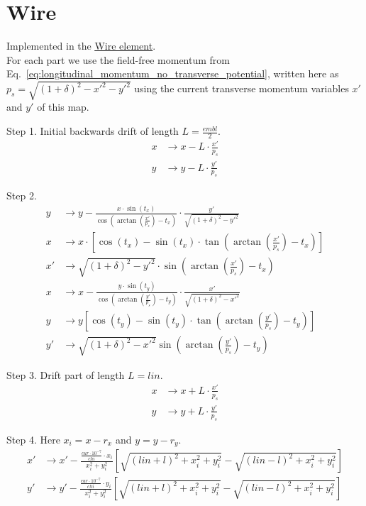 \section{Wire}

Implemented in the \href{https://xsuite.readthedocs.io/en/latest/apireference.html#wire}{\underline{Wire element}}.
~\\

For each part we use the field-free momentum from
Eq.~\eqref{eq:longitudinal_momentum_no_transverse_potential}, written here
as $p_s=\sqrt{(1+\delta)^2-x'^2-y'^2}$ using the current transverse
momentum variables $x'$ and $y'$ of this map.

Step 1. Initial backwards drift of length $L=\frac{embl}{2}$.
\begin{align*}
	x &\to x - L\cdot\frac{x'}{p_s} \\
    y &\to y - L\cdot\frac{y'}{p_s}
\end{align*}

Step 2.
\begin{align*}
	y &\to y - \frac{x\cdot\sin(t_x)}{
    \cos\left(\arctan\left(\frac{x'}{p_s}\right)-t_x\right)}\cdot
    \frac{y'}{\sqrt{(1+\delta)^2-y'^2}} \\
    x &\to x\cdot\left[\cos(t_x)-\sin(t_x)\cdot\tan\left(
    \arctan\left(\frac{x'}{p_s}\right)-t_x\right)\right] \\
    x' &\to \sqrt{(1+\delta)^2-y'^2}\cdot\sin\left(
    \arctan\left(\frac{x'}{p_s}\right)-t_x\right) \\
    x &\to x- \frac{y\cdot\sin(t_y)}{\cos\left(\arctan\left(\frac{y'}{p_s}\right)
    -t_y\right)} \cdot\frac{x'}{\sqrt{(1+\delta)^2-x'^2}} \\
    y &\to y \left[ \cos(t_y) - \sin(t_y)\cdot\tan\left(
    \arctan\left(\frac{y'}{p_s}\right)-t_y\right) \right] \\
    y' &\to \sqrt{(1+\delta)^2-x'^2}\sin\left(\arctan\left(
    \frac{y'}{p_s}\right)-t_y\right)
\end{align*}

Step 3. Drift part of length $L=lin$.
\begin{align*}
    x &\to x + L \cdot \frac{x'}{p_s} \\
    y &\to y + L \cdot \frac{y'}{p_s}
\end{align*}

Step 4. Here $x_i=x-r_x$ and $y=y-r_y$.
\begin{align*}
    x' &\to x' - \frac{\frac{cur\cdot10^{-7}}{chi}\cdot x_i}{x_i^2+y_i^2}
    \left[\sqrt{(lin+l)^2+x_i^2+y_i^2}-\sqrt{(lin-l)^2+x_i^2+y_i^2} \right] \\
    y' &\to y' - \frac{\frac{cur\cdot10^{-7}}{chi}\cdot y_i}{x_i^2+y_i^2}
    \left[\sqrt{(lin+l)^2+x_i^2+y_i^2}-\sqrt{(lin-l)^2+x_i^2+y_i^2} \right]
\end{align*}

